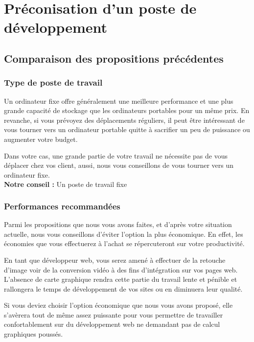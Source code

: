 \chapter{Préconisation d'un poste de développement}

\section{Comparaison des propositions précédentes}

\subsection{Type de poste de travail}

Un ordinateur fixe offre généralement une meilleure performance et une plus grande capacité de stockage que les ordinateurs portables pour un même prix. En revanche, si vous prévoyez des déplacements réguliers, il peut être intéressant de vous tourner vers un ordinateur portable quitte à sacrifier un peu de puissance ou augmenter votre budget.

Dans votre cas, une grande partie de votre travail ne nécessite pas de vous déplacer chez vos client, aussi, nous vous conseillons de vous tourner vers un ordinateur fixe.\\

\textbf{Notre conseil :} Un poste de travail fixe

\subsection{Performances recommandées}

Parmi les propositions que nous vous avons faites, et d'après votre situation actuelle, nous vous conseillons d'éviter l'option la plus économique. En effet, les économies que vous effectuerez à l'achat se répercuteront sur votre productivité.

En tant que développeur web, vous serez amené à effectuer de la retouche d'image voir de la conversion vidéo à des fins d'intégration sur vos pages web. L'absence de carte graphique rendra cette partie du travail lente et pénible et rallongera le temps de développement de vos sites ou en diminuera leur qualité.

Si vous deviez choisir l'option économique que nous vous avons proposé, elle s'avèrera tout de même assez puissante pour vous permettre de travailler confortablement sur du développement web ne demandant pas de calcul graphiques poussés.\\

